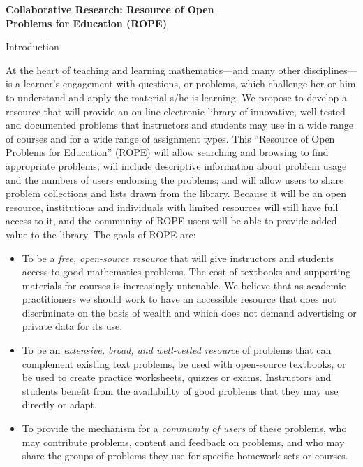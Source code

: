 \documentclass[11pt]{article}
\begin{document}
\begin{center}
{\Large \textbf{Collaborative Research: Resource of Open\\
Problems for Education (ROPE)}}
\end{center}

\begin{section}{Introduction}

At the heart of teaching and learning mathematics---and many other
disciplines---is a learner's engagement with questions, or problems, which
challenge her or him to understand and apply the material s/he is
learning.  We propose to develop a resource that will provide an on-line
electronic library of innovative, well-tested and documented problems that
instructors and students may use in a wide range of courses and for a wide
range of assignment types.  This ``Resource of Open Problems for
Education'' (ROPE) will allow searching and browsing to find appropriate
problems; will include descriptive information about problem usage and the
numbers of users endorsing the problems; and will allow users to share
problem collections and lists drawn from the library.  Because it will be
an open resource, institutions and individuals with limited resources will
still have full access to it, and the community of ROPE users will be able
to provide added value to the library.  The goals of ROPE are:
\begin{itemize}
  \item
    To be a \textit{free, open-source resource} that will give instructors
    and students access to good mathematics problems.  The cost of
    textbooks and supporting materials for courses is increasingly
    untenable.  We believe that as academic practitioners we should work
    to have an accessible resource that does not discriminate on the basis
    of wealth and which does not demand advertising or private data for
    its use.
  \item
    To be an \textit{extensive, broad, and well-vetted resource} of
    problems that can complement existing text problems, be used with
    open-source textbooks, or be used to create practice worksheets,
    quizzes or exams.  Instructors and students benefit from the
    availability of good problems that they may use directly or adapt.
  \item
    To provide the mechanism for a \textit{community of users} of these
    problems, who may contribute problems, content and feedback on
    problems, and who may share the groups of problems they use for
    specific homework sets or courses.
\end{itemize}

\end{section}
\end{document}
